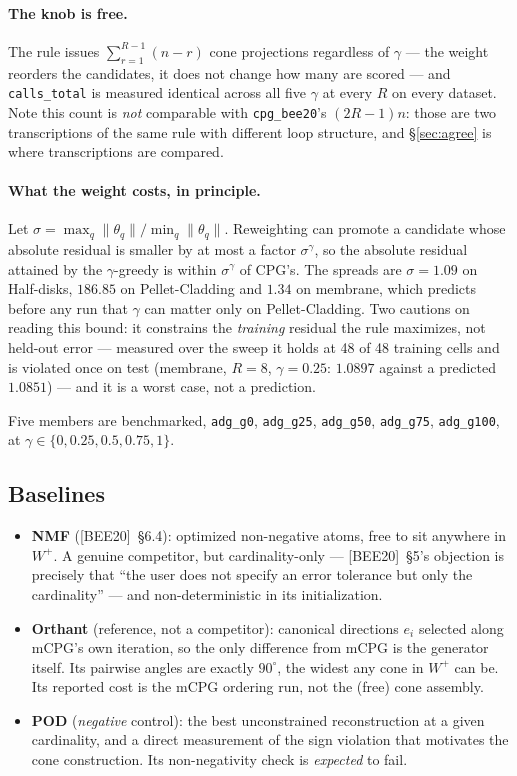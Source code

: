 \documentclass[11pt,a4paper]{article}
\newcommand{\Wp}{W^{+}}
\newcommand{\bee}{\textsf{[BEE20]}}
\begin{document}
\paragraph{The knob is free.} The rule issues $\sum_{r=1}^{R-1}(n-r)$ cone projections
regardless of $\gamma$ --- the weight reorders the candidates, it does not change how many
are scored --- and \texttt{calls\_total} is measured identical across all five $\gamma$ at
every $R$ on every dataset. Note this count is \emph{not} comparable with
\texttt{cpg\_bee20}'s $(2R-1)n$: those are two transcriptions of the same rule with
different loop structure, and \S\ref{sec:agree} is where transcriptions are compared.

\paragraph{What the weight costs, in principle.} Let
$\sigma=\max_q\|\theta_q\|/\min_q\|\theta_q\|$. Reweighting can promote a candidate whose
absolute residual is smaller by at most a factor $\sigma^{\gamma}$, so the absolute
residual attained by the $\gamma$-greedy is within $\sigma^{\gamma}$ of CPG's. The
spreads are $\sigma=1.09$ on Half-disks, $186.85$ on Pellet-Cladding and $1.34$ on
membrane, which predicts before any run that $\gamma$ can matter only on Pellet-Cladding.
Two cautions on reading this bound: it constrains the \emph{training} residual the rule
maximizes, not held-out error --- measured over the sweep it holds at 48 of 48 training
cells and is violated once on test (membrane, $R=8$, $\gamma=0.25$: $1.0897$ against a
predicted $1.0851$) --- and it is a worst case, not a prediction.

\noindent Five members are benchmarked, \texttt{adg\_g0}, \texttt{adg\_g25},
\texttt{adg\_g50}, \texttt{adg\_g75}, \texttt{adg\_g100}, at
$\gamma\in\{0,0.25,0.5,0.75,1\}$.

\subsection{Baselines}

\begin{itemize}
\item \textbf{NMF} (\bee{}~\S6.4): optimized non-negative atoms, free to sit anywhere in
$\Wp$. A genuine competitor, but cardinality-only --- \bee{}~\S5's objection is precisely
that ``the user does not specify an error tolerance but only the cardinality'' --- and
non-deterministic in its initialization.
\item \textbf{Orthant} (reference, not a competitor): canonical directions $e_i$ selected
along mCPG's own iteration, so the only difference from mCPG is the generator itself. Its
pairwise angles are exactly $90^{\circ}$, the widest any cone in $\Wp$ can be. Its
reported cost is the mCPG ordering run, not the (free) cone assembly.
\item \textbf{POD} (\emph{negative} control): the best unconstrained reconstruction at a
given cardinality, and a direct measurement of the sign violation that motivates the cone
construction. Its non-negativity check is \emph{expected} to fail.
\end{itemize}
\end{document}
